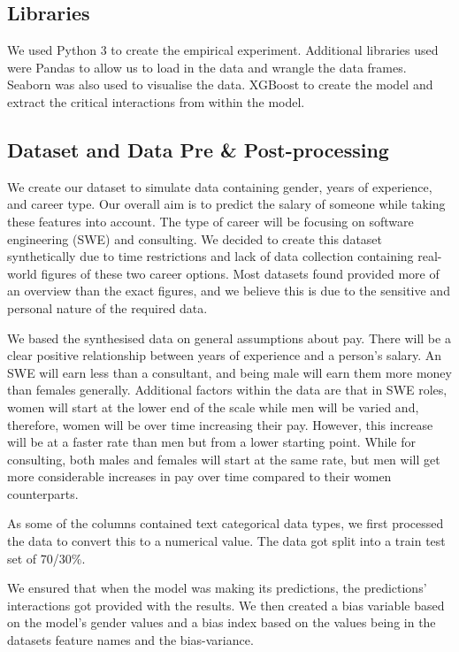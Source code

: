 \documentclass{sigchi}
\begin{document}
\subsection{Libraries}
	We used Python 3 \cite{python} to create the empirical experiment. Additional libraries used were Pandas \cite{pandas} to allow us to load in the data and wrangle the data frames. Seaborn \cite{seaborn} was also used to visualise the data. XGBoost \cite{xgboost} to create the model and extract the critical interactions from within the model. 

\subsection{Dataset and Data Pre \& Post-processing}
	We create our dataset to simulate data containing gender, years of experience, and career type. Our overall aim is to predict the salary of someone while taking these features into account. The type of career will be focusing on software engineering (SWE) and consulting.  We decided to create this dataset synthetically due to time restrictions and lack of data collection containing real-world figures of these two career options. Most datasets found provided more of an overview than the exact figures, and we believe this is due to the sensitive and personal nature of the required data.
	
	We based the synthesised data on general assumptions about pay. There will be a clear positive relationship between years of experience and a person's salary. An SWE will earn less than a consultant, and being male will earn them more money than females generally. Additional factors within the data are that in SWE roles, women will start at the lower end of the scale while men will be varied and, therefore, women will be over time increasing their pay. However, this increase will be at a faster rate than men but from a lower starting point. While for consulting, both males and females will start at the same rate, but men will get more considerable increases in pay over time compared to their women counterparts. 
	
	As some of the columns contained text categorical data types, we first processed the data to convert this to a numerical value. The data got split into a train test set of 70/30\%. 
	
	We ensured that when the model was making its predictions, the predictions' interactions got provided with the results. We then created a bias variable based on the model's gender values and a bias index based on the values being in the datasets feature names and the bias-variance. 
	
\end{document}
